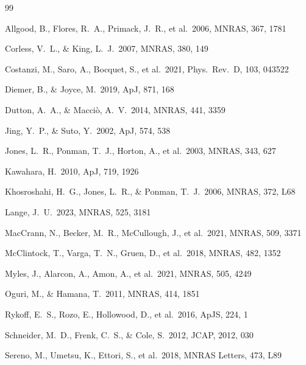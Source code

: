 \documentclass[11pt,a4paper]{article}
\providecommand{\mnras}{MNRAS}
\providecommand{\mnrasl}{MNRAS Letters}
\providecommand{\apj}{ApJ}
\providecommand{\apjs}{ApJS}
\providecommand{\jcap}{JCAP}
\providecommand{\prd}{Phys.~Rev.~D}
\begin{document}
\begin{thebibliography}{99}

Allgood, B., Flores, R.~A., Primack, J.~R., et al.\ 2006, \mnras, 367, 1781

Corless, V.~L., \& King, L.~J.\ 2007, \mnras, 380, 149

Costanzi, M., Saro, A., Bocquet, S., et al.\ 2021, \prd, 103, 043522

Diemer, B., \& Joyce, M.\ 2019, \apj, 871, 168

Dutton, A.~A., \& Macci\`o, A.~V.\ 2014, \mnras, 441, 3359

Jing, Y.~P., \& Suto, Y.\ 2002, \apj, 574, 538

Jones, L.~R., Ponman, T.~J., Horton, A., et al.\ 2003, \mnras, 343, 627

Kawahara, H.\ 2010, \apj, 719, 1926

Khosroshahi, H.~G., Jones, L.~R., \& Ponman, T.~J.\ 2006, \mnras, 372, L68

Lange, J.~U.\ 2023, \mnras, 525, 3181

MacCrann, N., Becker, M.~R., McCullough, J., et al.\ 2021, \mnras, 509, 3371

McClintock, T., Varga, T.~N., Gruen, D., et al.\ 2018, \mnras, 482, 1352

Myles, J., Alarcon, A., Amon, A., et al.\ 2021, \mnras, 505, 4249

Oguri, M., \& Hamana, T.\ 2011, \mnras, 414, 1851

Rykoff, E.~S., Rozo, E., Hollowood, D., et al.\ 2016, \apjs, 224, 1

Schneider, M.~D., Frenk, C.~S., \& Cole, S.\ 2012, \jcap, 2012, 030

Sereno, M., Umetsu, K., Ettori, S., et al.\ 2018, \mnrasl, 473, L89


\end{thebibliography}
\end{document}
